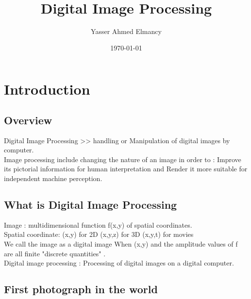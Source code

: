 \documentclass {book}
\begin{document}
	\title{Digital Image Processing}
	\author{Yasser Ahmed Elmancy}
	\date{\today}
	\maketitle
	\tableofcontents
	\chapter{Introduction}
	\section{Overview}
	 Digital Image Processing >> handling or Manipulation of digital images by computer.\\
	 Image processing include changing the nature of an image in order to : Improve its pictorial information for human interpretation and Render it more suitable for independent machine perception.\\
	 \section{What is Digital Image Processing}
	 Image : multidimensional function f(x,y) of spatial coordinates.\\
	 Spatial coordinate: (x,y) for 2D
	                     (x,y,z) for 3D
	                     (x,y,t) for movies \\
	 We call the image as a digital image When (x,y) and the amplitude values of f are
	 all finite "discrete quantities" .\\ 
	 Digital image processing : Processing of digital images on a digital computer.\\
	 \section{First photograph in the world} 
	 
	                   
	
\end{document}
